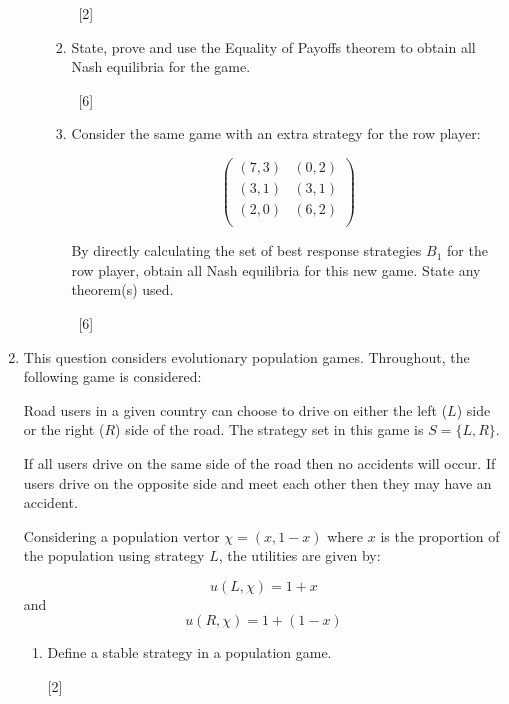 \documentclass[12pt,a4paper]{article}
\begin{document}
\begin{enumerate}
\begin{enumerate}
\begin{enumerate}
            ~\hfill{[2]}

            \item State, prove and use the Equality of Payoffs theorem to obtain all Nash equilibria for the game.

            ~\hfill{[6]}

            \item Consider the same game with an extra strategy for the row player:

                \[\begin{pmatrix}
                (7,3) & (0,2)\\
                (3,1) & (3,1)\\
                (2,0) & (6,2)\\
                \end{pmatrix}\]

                By directly calculating the set of best response strategies \(B_1\) for the row player, obtain all Nash equilibria for this new game.
                State any theorem(s) used.

            ~\hfill{[6]}

        \end{enumerate}
    \end{enumerate}

\newpage
\item
    This question considers evolutionary population games.
    Throughout, the following game is considered:

    Road users in a given country can choose to drive on either the left (\(L\)) side or the right (\(R\)) side of the road.
    The strategy set in this game is \(S=\{L, R\}\).

    If all users drive on the same side of the road then no accidents will occur.
    If users drive on the opposite side and meet each other then they may have an accident.

    Considering a population vertor \(\chi=(x,1-x)\) where \(x\) is the proportion of the population using strategy \(L\), the utilities are given by:

    \[u(L,\chi)=1+x\]
    and
    \[u(R,\chi)=1+(1-x)\]


    \begin{enumerate}

            \item Define a stable strategy in a population game.

            \hfill[2]


\end{enumerate}
\end{enumerate}
\end{document}

